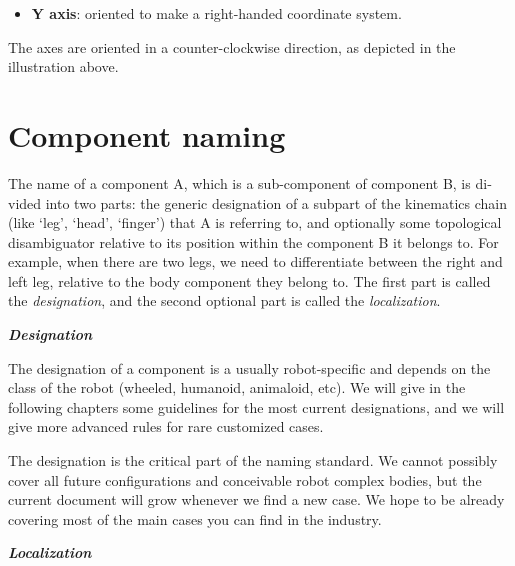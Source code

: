 \documentclass[a4paper]{article}
\newcommand\liststyleWWviiiNumxi{%
\renewcommand\labelitemi{[F0B7?]}
\renewcommand\labelitemii{o}
\renewcommand\labelitemiii{[F0A7?]}
\renewcommand\labelitemiv{[F0B7?]}
}
\begin{document}
\liststyleWWviiiNumxi
\begin{itemize}
\item {
\foreignlanguage{english}{\textsf{\textbf{Y
axis}}}\foreignlanguage{english}{\textsf{: oriented to make a
right-handed coordinate system. }}}
\end{itemize}
{\sffamily
The axes are oriented in a counter-clockwise direction, as depicted in
the illustration above.}

\section[Component naming]{ Component naming}
{
\foreignlanguage{english}{\textsf{The name of a component A, which is a
sub-component of component B, is divided into two parts: the generic
designation of a subpart of the kinematics chain (like ‘leg’, ‘head’,
‘finger’) that A is referring to, and optionally some topological
disambiguator relative to its position within the component B it
belongs to. For example, when there are two legs, we need to
differentiate between the right and left leg, relative to the body
component they belong to. The first part is called the
}}\foreignlanguage{english}{\textsf{\textit{designation}}}\foreignlanguage{english}{\textsf{,
and the second optional part is called the
}}\foreignlanguage{english}{\textsf{\textit{localization}}}\foreignlanguage{english}{\textsf{.}}}

{\sffamily\bfseries\itshape
Designation}

{\sffamily
The designation of a component is a usually robot-specific and depends
on the class of the robot (wheeled, humanoid, animaloid, etc). We will
give in the following chapters some guidelines for the most current
designations, and we will give more advanced rules for rare customized
cases. }

{\sffamily
The designation is the critical part of the naming standard. We cannot
possibly cover all future configurations and conceivable robot complex
bodies, but the current document will grow whenever we find a new case.
We hope to be already covering most of the main cases you can find in
the industry.}

{\sffamily\bfseries\itshape
Localization }
\end{document}
